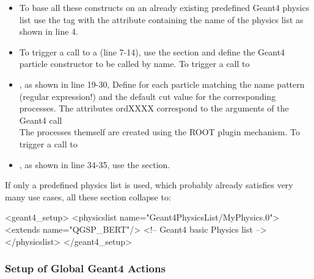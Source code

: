 \begin{itemize}\itemcompact
\item To base all these constructs on an already existing predefined Geant4 physics list
    use the  tag with the attribute containing the name of the physics list
    as shown in line 4.
\item To trigger a call to a  (line 7-14), use the  section 
    and define the Geant4 particle constructor to be called by name. To trigger a call to
\item {}, as shown in line 19-30, 
    Define for each particle matching the name pattern (regular expression!) and the 
    default cut value for the corresponding processes. The attributes ordXXXX correspond
    to the arguments of the Geant4 call \\
    The processes themself are created using the ROOT plugin mechanism.
    To trigger a call to
\item {}, as shown in line 34-35, use the  section.
\end{itemize}
If only a predefined physics list is used, which probably already satisfies very many use cases,
all these section collapse to:
\begin{code}
<geant4_setup>
  <physicslist name="Geant4PhysicsList/MyPhysics.0">
    <extends name="QGSP_BERT"/>                    <!-- Geant4 basic Physics list -->
  </physicslist>
</geant4_setup>
\end{code}

\subsubsection{Setup of Global Geant4 Actions}
\label{sec:ddg4-setup-xml-geant4-actions}

